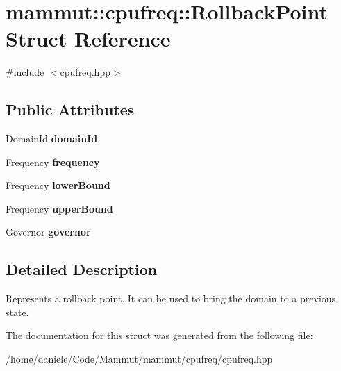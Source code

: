 \hypertarget{structmammut_1_1cpufreq_1_1RollbackPoint}{\section{mammut\-:\-:cpufreq\-:\-:Rollback\-Point Struct Reference}
\label{structmammut_1_1cpufreq_1_1RollbackPoint}
}


{\ttfamily \#include $<$cpufreq.\-hpp$>$}

\subsection*{Public Attributes}
\begin{DoxyCompactItemize}
\item 
\hypertarget{structmammut_1_1cpufreq_1_1RollbackPoint_a68b9930c802f1489095a403a0bf77cbd}{Domain\-Id {\bfseries domain\-Id}}\label{structmammut_1_1cpufreq_1_1RollbackPoint_a68b9930c802f1489095a403a0bf77cbd}

\item 
\hypertarget{structmammut_1_1cpufreq_1_1RollbackPoint_a20730093c53dc09d9654f979122f0942}{Frequency {\bfseries frequency}}\label{structmammut_1_1cpufreq_1_1RollbackPoint_a20730093c53dc09d9654f979122f0942}

\item 
\hypertarget{structmammut_1_1cpufreq_1_1RollbackPoint_a796c257a4cb2a15e4ad49b9b66ad7f00}{Frequency {\bfseries lower\-Bound}}\label{structmammut_1_1cpufreq_1_1RollbackPoint_a796c257a4cb2a15e4ad49b9b66ad7f00}

\item 
\hypertarget{structmammut_1_1cpufreq_1_1RollbackPoint_aea49781cf4766e7fd9f211d7a376072c}{Frequency {\bfseries upper\-Bound}}\label{structmammut_1_1cpufreq_1_1RollbackPoint_aea49781cf4766e7fd9f211d7a376072c}

\item 
\hypertarget{structmammut_1_1cpufreq_1_1RollbackPoint_a1363d21850bc558911d4e7e576ab8d1e}{Governor {\bfseries governor}}\label{structmammut_1_1cpufreq_1_1RollbackPoint_a1363d21850bc558911d4e7e576ab8d1e}

\end{DoxyCompactItemize}


\subsection{Detailed Description}
Represents a rollback point. It can be used to bring the domain to a previous state. 

The documentation for this struct was generated from the following file\-:\begin{DoxyCompactItemize}
\item 
/home/daniele/\-Code/\-Mammut/mammut/cpufreq/cpufreq.\-hpp\end{DoxyCompactItemize}
